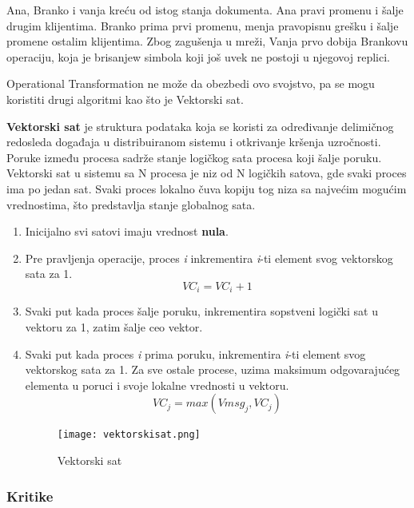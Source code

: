 \documentclass[12pt]{article}
\begin{document}
\begin{itemize}
	      Ana, Branko i vanja kreću od istog stanja dokumenta. Ana pravi promenu i šalje drugim klijentima. Branko prima prvi promenu, menja pravopisnu grešku i šalje promene ostalim klijentima. Zbog zagušenja u mreži, Vanja prvo dobija Brankovu operaciju, koja je brisanjew simbola koji još uvek ne postoji u njegovoj replici.
	      
	      Operational Transformation ne može da obezbedi ovo svojstvo, pa se mogu koristiti drugi algoritmi kao što je Vektorski sat.
	      
	      \textbf{Vektorski sat} je struktura podataka koja se koristi za određivanje delimičnog redosleda događaja u distribuiranom sistemu i otkrivanje kršenja uzročnosti. Poruke između procesa sadrže stanje logičkog sata procesa koji šalje poruku. Vektorski sat u sistemu sa N procesa je niz od N logičkih satova, gde svaki proces ima po jedan sat. Svaki proces lokalno čuva kopiju tog niza sa najvećim mogućim vrednostima, što predstavlja stanje globalnog sata.
	      
	      \begin{enumerate}
	      	\item Inicijalno svi satovi imaju vrednost \textbf{nula}.
	      	\item Pre pravljenja operacije, proces \textit{i} inkrementira \textit{i}-ti element svog vektorskog sata za 1.
	      	      \[ VC_i = VC_i + 1 \]
	      	\item Svaki put kada proces šalje poruku, inkrementira sopstveni logički sat u vektoru za 1, zatim šalje ceo vektor.
	      	\item Svaki put kada proces \textit{i} prima poruku, inkrementira \textit{i}-ti element svog vektorskog sata za 1. Za sve ostale procese, uzima maksimum odgovarajućeg elementa u poruci i svoje lokalne vrednosti u vektoru.
	      	      \[ VC_j = max(Vmsg_j, VC_j)\]
	      	      \begin{figure}[H]
	      	      	\centering
	      	      	\texttt{[image: vektorskisat.png]}
	      	      	\caption{Vektorski sat}
	      	      	
	      	      \end{figure}
	      	                  
	      \end{enumerate}
	      
\end{itemize}

\subsubsection{Kritike}
\end{document}
